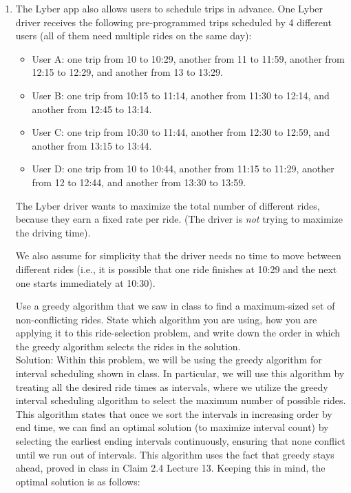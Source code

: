 \documentclass[11pt]{article}
\begin{document}
\begin{enumerate}
\begin{enumerate}
    \item The Lyber app also allows users to schedule trips in advance. One Lyber driver receives the following pre-programmed trips scheduled by 4 different users (all of them need multiple rides on the same day):
    \begin{itemize}
        \item User A: one trip from 10 to 10:29, another from 11 to 11:59, another from 12:15 to 12:29, and another from 13 to 13:29.
        \item User B: one trip from 10:15 to 11:14, another from 11:30 to 12:14, and another from 12:45 to 13:14.
        \item User C: one trip from 10:30 to 11:44, another from 12:30 to 12:59, and another from 13:15 to 13:44.
        \item User D: one trip from 10 to 10:44, another from 11:15 to 11:29, another from 12 to 12:44, and another from 13:30 to 13:59.
    \end{itemize}
    The Lyber driver wants to maximize the total number of different rides, because they earn a fixed rate per ride. (The driver is \textit{not} trying to maximize the driving time). 

    We also assume for simplicity that the driver needs no time to move between different rides (i.e., it is possible that one ride finishes at 10:29 and the next one starts immediately at 10:30). 

    Use a greedy algorithm that we saw in class to find a maximum-sized set of non-conflicting rides.  State which algorithm you are using, how you are applying it to this ride-selection problem, and write down the order in which the greedy algorithm selects the rides in the solution. \\
    
    Solution: Within this problem, we will be using the greedy algorithm for interval scheduling shown in class. In particular, we will use this algorithm by treating all the desired ride times as intervals, where we utilize the greedy interval scheduling algorithm to select the maximum number of possible rides. This algorithm states that once we sort the intervals in increasing order by end time, we can find an optimal solution (to maximize interval count) by selecting the earliest ending intervals continuously, ensuring that none conflict until we run out of intervals. This algorithm uses the fact that greedy stays ahead, proved in class in Claim 2.4 Lecture 13. Keeping this in mind, the optimal solution is as follows: \\
    

\end{enumerate}
\end{enumerate}
\end{document}
